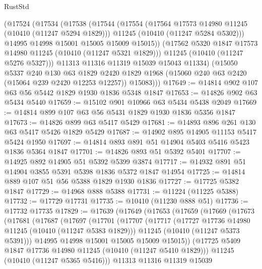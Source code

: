 \begin{lexlean}{RustStd}
\begin{coremodule}
        (@17524
          (@17534
            (@17538
              (@17544
                (@17554
                  (@17564 @17573 @14980 @11245 (@10410 (@11247 @5294 @1829)))
                  @11245
                  (@10410 (@11247 @5284 @5302)))
                @14995
                @14998
                @15001
                @15005
                @15009
                @15015))
            (@17562 @5320 @1847 @17573 @14980 @11245 (@10410 (@11247 @5321 @1829)))
            @11245
            (@10410 (@11247 @5276 @5327)))
          @11313
          @11316
          @11319
          @15039
          @15043
          @11334)
        (@15050
          @5337
          @240
          @130
          @63
          @1829
          @2420
          @1829
          @1968
          (@15060 @240 @63 @2420 (@15064 @239 @2420 @12253 @12257))
          @15083)))
@17649 := @14814 @902 @107 @63 @56 @5442 @1829 @1930 @1836 @5348 @1847
@17653 := @14826 @902 @63 @5434 @5440
@17659 := @15102 @901 @10966 @63 @5434 @5438 @2049
@17669 := @14814 @899 @107 @63 @56 @5431 @1829 @1930 @1836 @5356 @1847
@17673 := @14826 @899 @63 @5417 @5429
@17681 := @14893 @896 @261 @130 @63 @5417 @5426 @1829 @5429
@17687 := @14902 @895 @14905 @11153 @5417 @5424 @1950
@17697 := @14814 @893 @891 @51 @14904 @5403 @5416 @5423 @1836 @5364 @1847
@17701 := @14826 @893 @51 @5392 @5401
@17707 := @14925 @892 @14905 @51 @5392 @5399 @3874
@17717 := @14932 @891 @51 @14904 @3855 @5391 @5398 @1836 @5372 @1847 @14954
@17725 := @14814 @889 @107 @51 @56 @5388 @1829 @1930 @1836
@17727 := @17725 @5382 @1847
@17729 := @14968 @888 @5388
@17731 := @11224 (@11225 @5388)
@17732 := @17729 @17731
@17735 := @10410 (@11230 @888 @51)
@17736 := @17732 @17735
@17829 := @17639
    (@17649
      (@17653
        (@17659
          (@17669
            (@17673
              (@17681
                (@17687
                  (@17697
                    (@17701
                      (@17707
                        (@17717
                          (@17727 @17736 @14980 @11245 (@10410 (@11247 @5383 @1829)))
                          @11245
                          (@10410 (@11247 @5373 @5391)))
                        @14995
                        @14998
                        @15001
                        @15005
                        @15009
                        @15015))
                    (@17725 @5409 @1847 @17736 @14980 @11245 (@10410 (@11247 @5410 @1829)))
                    @11245
                    (@10410 (@11247 @5365 @5416)))
                  @11313
                  @11316
                  @11319
                  @15039

\end{coremodule}
\end{lexlean}
